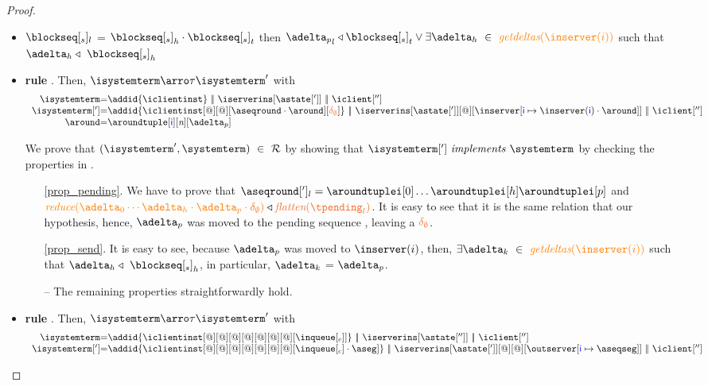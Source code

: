 \begin{proof}
\begin{itemize}
\begin{itemize}
\begin{enumerate}
					\end{enumerate}
	\item \label{prop_send} $\tsent_l$ = ${\tsent}_h \cdot {\tsent}_t $ then $ {\pushbuffer}_l \triangleleft {\tsent}_t \lor \exists \adelta_h\ \in \ \igetdeltas{\inserver(i)}$ such that $\adelta_h \triangleleft \ {\tsent}_h$


\item {\bf rule }. Then, $\isystemterm  \arroi{\tau} \isystemterm '$ with 
				\[\begin{array}{r@{=}l}
					\isystemterm & \addid{\iclientinst} \ \bigpar \ \iserverins[\astate[']] \ \bigpar\ \iclient['']\ \\
					\isystemterm['] & \addid{\iclientinst[@][@][\pending \cdot \around][\emptydelta]}
		\ \bigpar \ \iserverins[{\astate[']}][@][\inserver\upd{\cid}{\inserver(\cid)\cdot\around}]
		\ \bigpar\ \iclient[''] \\
					\around & \aroundtuple[\cid][\nround][\pushbuffer]
					\end{array}
				\]
							
				We  prove that $(\isystemterm',\systemterm) \ \in \ \mathcal{R}$ by showing that $\implements{\isystemterm[']}{\systemterm}$ 
				by checking the properties in .			

						\begin{itemize}
							\item[\ref{prop_pending}.] We have to prove that $\pending[']_l = \aroundtuplei[0]\ldots\aroundtuplei[h]\aroundtuplei[p]$ and $\ireduce{\adelta_0\cdots\adelta_h\cdot\adelta_p\cdot\emptydelta} \triangleleft \flatten{\tpending_l}$. It is easy to see that it is the same relation that our hypothesis, hence, $\adelta_p$ was moved to the pending sequence , leaving a $\emptydelta$.
							\item[\ref{prop_send}.] It is easy to see, because ${\pushbuffer}$ was moved to $\inserver(i)$, then, $\exists \adelta_k\ \in \ \igetdeltas{\inserver(i)}$ such that $\adelta_h \triangleleft \ {\tsent}_h$, in particular, $\adelta_k$ = $\pushbuffer$.
						\item[{--}] The remaining properties straightforwardly hold.
							
						\end{itemize}


\item {\bf rule }. Then, $\isystemterm  \arroi{\tau} \isystemterm '$ with 
				\[\begin{array}{r@{=}l}
					\isystemterm & \addid{\iclientinst[@][@][@][@][@][@][@][\inclient]} \ \bigpar \ \iserverins[\astate['']] \ \bigpar\ \iclient['']
					\\
					\isystemterm['] & \addid{\iclientinst[@][@][@][@][@][@][@][\inclient\cdot \aseg]} \ \bigpar \ \iserverins[{\astate[']}][@][@][\outserver\upd{\cid}\aseqseg] \ \bigpar\ \iclient['']
					

\end{array}\]
\end{itemize}
\end{itemize}
\end{proof}
